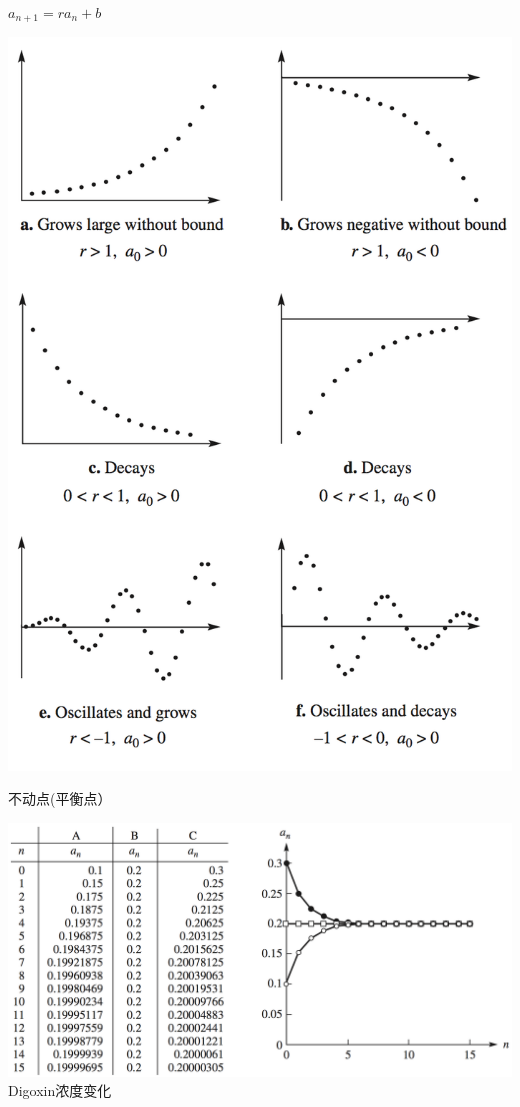 \documentclass[UTF8, mathserif]{ctexbeamer}
\begin{document}
\begin{frame}{$a_{n+1}=ra_n + b$}
  \begin{center}
    \includegraphics[height=.9\textheight{}]{rb.png}
  \end{center}
\end{frame}

\begin{frame}{不动点(平衡点）}
  \begin{center}
    \includegraphics[width=.8\textwidth{}]{fixedpoint.png}\\
    Digoxin浓度变化
  \end{center}
  
\end{frame}
\end{document}
